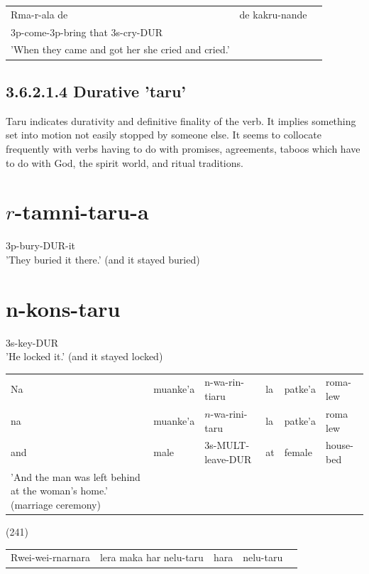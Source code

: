 \documentclass[10pt]{article}
\begin{document}
\begin{center}
\begin{tabular}{lll}
Rma-r-ala de & de kakru-nande \\
3p-come-3p-bring that 3s-cry-DUR &  \\
'When they came and got her she cried and cried.' &  \\
\end{tabular}
\end{center}

\subsection*{3.6.2.1.4 Durative 'taru'}
Taru indicates durativity and definitive finality of the verb. It implies something set into motion not easily stopped by someone else. It seems to collocate frequently with verbs having to do with promises, agreements, taboos which have to do with God, the spirit world, and ritual traditions.

\section*{\(r\)-tamni-taru-a}
3p-bury-DUR-it\\
'They buried it there.' (and it stayed buried)

\section*{n-kons-taru}
3s-key-DUR\\
'He locked it.' (and it stayed locked)

\begin{center}
\begin{tabular}{llllll}
Na & muanke'a & n-wa-rin-tiaru & la & patke'a & roma-lew \\
na & muanke'a & \(n\)-wa-rini-taru & la & patke'a & roma lew \\
and & male & 3s-MULT-leave-DUR & at & female & house-bed \\
'And the man was left behind at the woman's home.' (marriage ceremony) &  &  &  &  &  \\
\end{tabular}
\end{center}

(241)

\begin{center}
\begin{tabular}{lllll}
Rwei-wei-rnarnara & lera maka har nelu-taru & hara & nelu-taru \\
\end{tabular}
\end{center}
\end{document}
